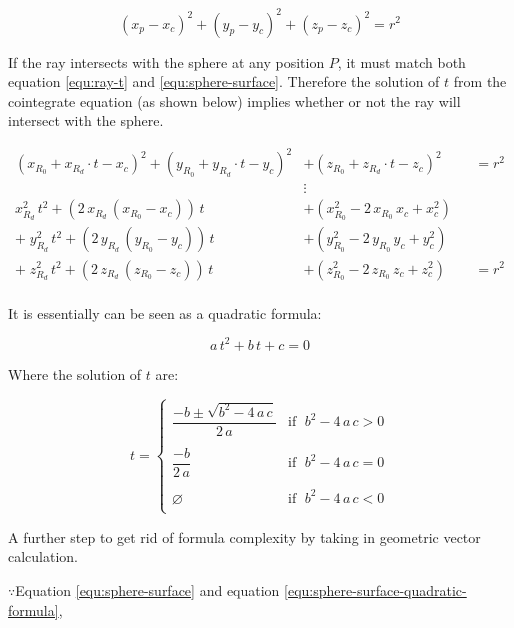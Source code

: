 \begin{equation}
\label{equ:sphere-surface}
(x_p - x_c)^2 + (y_p - y_c)^2 + (z_p - z_c)^2 = r^2
\end{equation}

If the ray intersects with the sphere at any position $P$, it must match both equation \ref{equ:ray-t} and \ref{equ:sphere-surface}. Therefore the solution of $t$ from the cointegrate equation (as shown below) implies whether or not the ray will intersect with the sphere.

\[
\begin{aligned}
(x_{R_0} + x_{R_d} \cdot t - x_c)^2 + (y_{R_0} + y_{R_d} \cdot t - y_c)^2 &+ (z_{R_0} + z_{R_d} \cdot t - z_c)^2 &&= r^2\\
&\vdots\\
x_{R_d}^2\,t^2 + (2\,x_{R_d}\,(x_{R_0} - x_c))\,t &+ (x_{R_0}^2 - 2\,x_{R_0}\,x_c + x_c^2)\\
+\;y_{R_d}^2\,t^2 + (2\,y_{R_d}\,(y_{R_0} - y_c))\,t &+ (y_{R_0}^2 - 2\,y_{R_0}\,y_c + y_c^2)\\
+\;z_{R_d}^2\,t^2 + (2\,z_{R_d}\,(z_{R_0} - z_c))\,t &+ (z_{R_0}^2 - 2\,z_{R_0}\,z_c + z_c^2) &&= r^2\\
\end{aligned}
\]

It is essentially can be seen as a quadratic formula:

\begin{equation}
\label{equ:sphere-surface-quadratic-formula}
a\,t^2 + b\,t + c = 0
\end{equation}

Where the solution of $t$ are:

\begin{equation}
\label{equ:sphere-t-solution}
t =
\begin{cases}
\dfrac{-b \pm \sqrt{b^2 - 4\,a\,c}}{2\,a} & \text{if }\;b^2 - 4\,a\,c > 0\\\\
\dfrac{-b}{2\,a} & \text{if }\; b^2 - 4\,a\,c = 0\\\\
\varnothing & \text{if }\; b^2 - 4\,a\,c < 0\\
\end{cases}
\end{equation}

A further step to get rid of formula complexity by taking in geometric vector calculation.


$\because$\;\;\;\;Equation \ref{equ:sphere-surface} and equation \ref{equ:sphere-surface-quadratic-formula},

